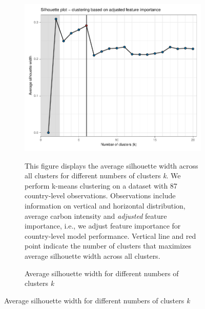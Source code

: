 \begin{figure}[ht!]
\centering
  \caption{Silhouette analysis}\label{fig:Silhouette}
   \begin{subfigure}[b]{\textwidth}
   \centering
   \caption{Average silhouette width for different numbers of clusters \textit{k}} \label{fig:G3_silhouette_2}
   \includegraphics{Figures_Appendix/Figure_Silhouette_2}
   \begin{subcaption2}
     This figure displays the average silhouette width across all clusters for different numbers of clusters \textit{k}. We perform k-means clustering on a dataset with 87 country-level observations. Observations include information on vertical and horizontal distribution, average carbon intensity and \textit{adjusted} feature importance, i.e., we adjust feature importance for country-level model performance. Vertical line and red point indicate the number of clusters that maximizes average silhouette width across all clusters.
   \end{subcaption2}
   \end{subfigure}
 \end{figure}
 \clearpage

